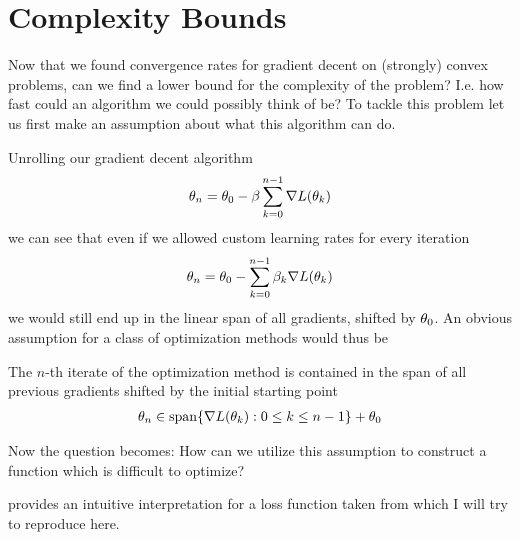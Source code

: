 \section{Complexity Bounds}

Now that we found convergence rates for gradient decent on (strongly) convex
problems, can we find a lower bound for the complexity of the problem? I.e. how
fast could an algorithm we could possibly think of be? To tackle this problem
let us first make an assumption about what this algorithm can do.

Unrolling our gradient decent algorithm
%
\begin{align*}
	\theta_n = \theta_0 - \beta\sum_{k=0}^{n-1} \nabla L(\theta_k)
\end{align*}
%
we can see that even if we allowed custom learning rates for every iteration
%
\begin{align*}
	\theta_n = \theta_0 - \sum_{k=0}^{n-1} \beta_k \nabla L(\theta_k)
\end{align*}
%
we would still end up in the linear span of all gradients, shifted by \(\theta_0\).
An obvious assumption for a class of optimization methods would thus be
%
\begin{assumption}
	\label{assmpt: parameter in linear hull of gradients}
	The \(n\)-th iterate of the optimization method is contained in the span of all
	previous gradients shifted by the initial starting point
	\begin{align*}
		\theta_n \in \text{span}\{\nabla L(\theta_k) : 0\le k \le n-1\} + \theta_0
	\end{align*}
\end{assumption}

Now the question becomes: How can we utilize this assumption to construct a
function which is difficult to optimize?

\textcite{gohWhyMomentumReally2017} provides an intuitive interpretation for a loss
function taken from \textcite[Section 2.1.2]{nesterovLecturesConvexOptimization2018}
which I will try to reproduce here.

